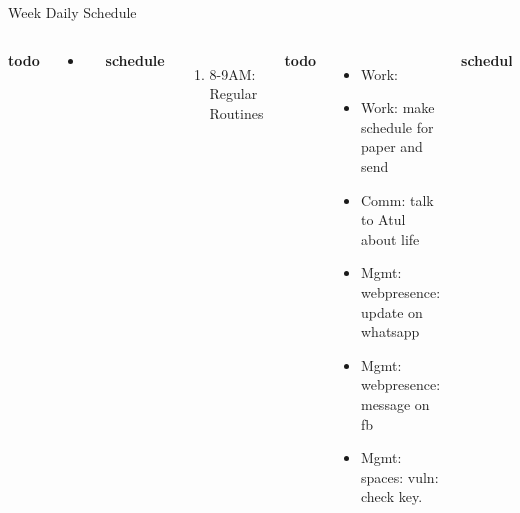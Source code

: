 \documentclass[serif, mathserif, final]{beamer}
\begin{document}
\begin{frame}{}
\begin{columns}
\begin{column}{0.50\linewidth}
\begin{block}{Week Daily Schedule}
\begin{columns}
  \textbf{\small todo}\\
  \begin{itemize}
    \tiny \item \tiny 

  \end{itemize}
  \textbf{\small schedule}\\ 
  \begin{enumerate}
    \tiny \item \tiny 8-9AM: Regular Routines 
  \end{enumerate}
  
  \textbf{\small todo}\\
  \begin{itemize}
  \item \tiny Work: 
    \item \tiny Work: make schedule for paper and send 
    \item \tiny Comm: talk to Atul about life
    \item \tiny Mgmt: webpresence: update on whatsapp  
    \item \tiny Mgmt: webpresence: message on fb 

    \item \tiny Mgmt: spaces: vuln: check key. 
  \end{itemize}
  \textbf{\small schedule}\\
  \begin{enumerate} 
    \tiny \item \tiny 
  \end{enumerate} 
    \end{columns}
  \end{block}
\end{column}%


\end{columns}
\end{frame}
\end{document}
